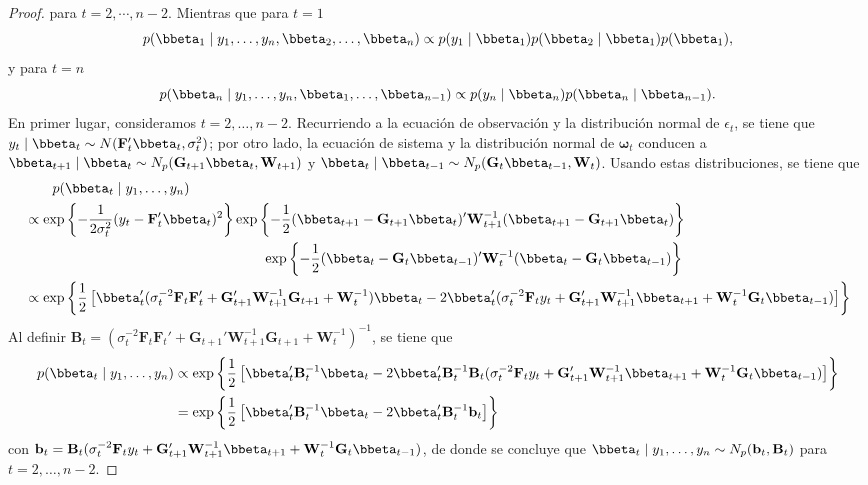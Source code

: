 \begin{proof}
para $t=2,\cdots,n-2$. Mientras que para $t=1$
\begin{equation}\label{posbeta1}
p(\bbeta_1 \mid y_1,\ldots,y_n,\bbeta_2, \ldots,\bbeta_n)\propto p(y_1 \mid \bbeta_1)p(\bbeta_2 \mid \bbeta_1)p(\bbeta_1),
\end{equation}
y para $t=n$
\begin{equation}\label{posbetan}
p(\bbeta_n \mid y_1,\ldots,y_n,\bbeta_1, \ldots,\bbeta_{n-1})\propto p(y_n \mid \bbeta_n)p(\bbeta_n \mid \bbeta_{n-1}).
\end{equation}
En primer lugar, consideramos $t=2,\ldots,n-2$. Recurriendo a la ecuación de observación y la distribución normal de $\epsilon_t$, se tiene que $y_t \mid \bbeta_t\sim N(\mathbf{F}_t'\bbeta_t,\sigma_t^2)$; por otro lado, la ecuación de sistema y la distribución normal de $\boldsymbol{\omega}_t$ conducen a $\bbeta_{t+1} \mid \bbeta_t\sim N_p(\mathbf{G}_{t+1}\bbeta_t,\mathbf{W}_{t+1})$ y $\bbeta_t \mid \bbeta_{t-1}\sim N_p(\mathbf{G}_t\bbeta_{t-1},\mathbf{W}_t)$. Usando estas distribuciones, se tiene que
\begin{align*}
&\ \ \ \ \ \ p(\bbeta_t \mid y_1,\ldots,y_n)\\&\propto
\exp\left\{-\frac{1}{2\sigma_t^2}(y_t-\mathbf{F}_t'\bbeta_t)^2\right\}\exp\left\{-\frac{1}{2}(\bbeta_{t+1}-\mathbf{G}_{t+1}\bbeta_t)'\mathbf{W}_{t+1}^{-1}(\bbeta_{t+1}-\mathbf{G}_{t+1}\bbeta_t)\right\}\\
&\hspace{6cm}\exp\left\{-\frac{1}{2}(\bbeta_t-\mathbf{G}_t\bbeta_{t-1})'\mathbf{W}_t^{-1}(\bbeta_t-\mathbf{G}_t\bbeta_{t-1})\right\}\\
&\propto \exp\left\{\frac{1}{2}\left[\bbeta_t'(\sigma^{-2}_t\mathbf{F}_t\mathbf{F}_t'+\mathbf{G}_{t+1}'\mathbf{W}_{t+1}^{-1}\mathbf{G}_{t+1}+\mathbf{W}_t^{-1})\bbeta_t-2\bbeta_t'(\sigma^{-2}_t\mathbf{F}_ty_t+\mathbf{G}_{t+1}'\mathbf{W}_{t+1}^{-1}\bbeta_{t+1}+\mathbf{W}_t^{-1}\mathbf{G}_t\bbeta_{t-1})\right]\right\}
\end{align*}
Al definir $\mathbf{B}_t=(\sigma^{-2}_t\mathbf{F}_t\mathbf{F}_t'+\mathbf{G}_{t+1}'\mathbf{W}_{t+1}^{-1}\mathbf{G}_{t+1}+\mathbf{W}_t^{-1})^{-1}$, se tiene que
\begin{align*}
p(\bbeta_t \mid y_1,\ldots,y_n)&\propto\exp\left\{\frac{1}{2}\left[\bbeta_t'\mathbf{B}_t^{-1}\bbeta_t-2\bbeta_t'\mathbf{B}_t^{-1}\mathbf{B}_t(\sigma^{-2}_t\mathbf{F}_ty_t+\mathbf{G}_{t+1}'\mathbf{W}_{t+1}^{-1}\bbeta_{t+1}+\mathbf{W}_t^{-1}\mathbf{G}_t\bbeta_{t-1})\right]\right\}\\
&=\exp\left\{\frac{1}{2}\left[\bbeta_t'\mathbf{B}_t^{-1}\bbeta_t-2\bbeta_t'\mathbf{B}_t^{-1}\mathbf{b}_t\right]\right\}
\end{align*}
con $\mathbf{b}_t=\mathbf{B}_t(\sigma^{-2}_t\mathbf{F}_ty_t+\mathbf{G}_{t+1}'\mathbf{W}_{t+1}^{-1}\bbeta_{t+1}+\mathbf{W}_t^{-1}\mathbf{G}_t\bbeta_{t-1})$, de donde se concluye que $\bbeta_t \mid y_1,\ldots,y_n\sim N_p(\mathbf{b}_t,\mathbf{B}_t)$ para $t=2,\ldots,n-2$.


\end{proof}
